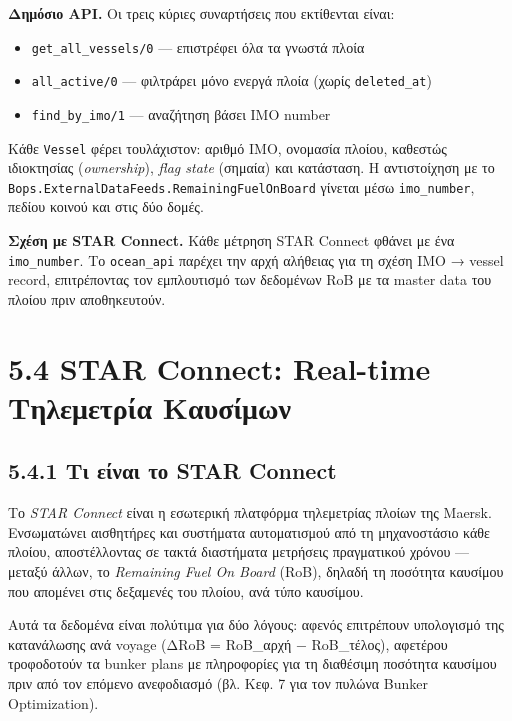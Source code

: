 \textbf{Δημόσιο API.} Οι τρεις κύριες συναρτήσεις που εκτίθενται είναι:

\begin{itemize}
\tightlist
\item
  \texttt{get\_all\_vessels/0} --- επιστρέφει όλα τα γνωστά πλοία
\item
  \texttt{all\_active/0} --- φιλτράρει μόνο ενεργά πλοία (χωρίς
  \texttt{deleted\_at})
\item
  \texttt{find\_by\_imo/1} --- αναζήτηση βάσει IMO number
\end{itemize}

Κάθε \texttt{Vessel} φέρει τουλάχιστον: αριθμό IMO, ονομασία πλοίου,
καθεστώς ιδιοκτησίας (\emph{ownership}), \emph{flag state} (σημαία) και
κατάσταση. Η αντιστοίχηση με το
\texttt{Bops.ExternalDataFeeds.RemainingFuelOnBoard} γίνεται μέσω
\texttt{imo\_number}, πεδίου κοινού και στις δύο δομές.

\textbf{Σχέση με STAR Connect.} Κάθε μέτρηση STAR Connect φθάνει με ένα
\texttt{imo\_number}. Το \texttt{ocean\_api} παρέχει την αρχή αλήθειας
για τη σχέση IMO → vessel record, επιτρέποντας τον εμπλουτισμό των
δεδομένων RoB με τα master data του πλοίου πριν αποθηκευτούν.

\section{5.4 STAR Connect: Real-time Τηλεμετρία
Καυσίμων}\label{star-connect-real-time-ux3c4ux3b7ux3bbux3b5ux3bcux3b5ux3c4ux3c1ux3afux3b1-ux3baux3b1ux3c5ux3c3ux3afux3bcux3c9ux3bd}

\subsection{5.4.1 Τι είναι το STAR
Connect}\label{ux3c4ux3b9-ux3b5ux3afux3bdux3b1ux3b9-ux3c4ux3bf-star-connect}

Το \emph{STAR Connect} είναι η εσωτερική πλατφόρμα τηλεμετρίας πλοίων
της Maersk. Ενσωματώνει αισθητήρες και συστήματα αυτοματισμού από τη
μηχανοστάσιο κάθε πλοίου, αποστέλλοντας σε τακτά διαστήματα μετρήσεις
πραγματικού χρόνου --- μεταξύ άλλων, το \emph{Remaining Fuel On Board}
(RoB), δηλαδή τη ποσότητα καυσίμου που απομένει στις δεξαμενές του
πλοίου, ανά τύπο καυσίμου.

Αυτά τα δεδομένα είναι πολύτιμα για δύο λόγους: αφενός επιτρέπουν
υπολογισμό της κατανάλωσης ανά voyage (ΔRoB = RoB\_αρχή − RoB\_τέλος),
αφετέρου τροφοδοτούν τα bunker plans με πληροφορίες για τη διαθέσιμη
ποσότητα καυσίμου πριν από τον επόμενο ανεφοδιασμό (βλ. Κεφ. 7 για τον
πυλώνα Bunker Optimization).

